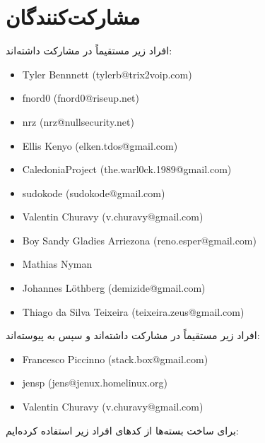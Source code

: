 \section{مشارکت‌کنندگان}
افراد زیر مستقیماً در  مشارکت داشته‌اند:
\begin{latin}
\begin{itemize}
\item Tyler Bennnett (tylerb@trix2voip.com)
\item fnord0 (fnord0@riseup.net)
\item nrz (nrz@nullsecurity.net)
\item Ellis Kenyo (elken.tdos@gmail.com)
\item CaledoniaProject (the.warl0ck.1989@gmail.com)
\item sudokode (sudokode@gmail.com)
\item Valentin Churavy (v.churavy@gmail.com)
\item Boy Sandy Gladies Arriezona (reno.esper@gmail.com)
\item Mathias Nyman
\item Johannes Löthberg (demizide@gmail.com)
\item Thiago da Silva Teixeira (teixeira.zeus@gmail.com)
\end{itemize}
\end{latin}
افراد زیر مستقیماً در  مشارکت داشته‌اند
و سپس به  پیوسته‌اند:
\begin{latin}
\begin{itemize}
\item Francesco Piccinno (stack.box@gmail.com)
\item jensp (jens@jenux.homelinux.org)
\item Valentin Churavy (v.churavy@gmail.com)
\end{itemize}
\end{latin}
برای ساخت بسته‌ها از کدهای افراد زیر استفاده کرده‌ایم:
